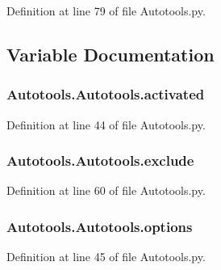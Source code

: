Definition at line 79 of file Autotools.\-py.



\subsection{Variable Documentation}
\hypertarget{group___tools_ga6bbb714a91bc8b6fe749326772b073b3}{
\subsubsection[{activated}]{\setlength{\rightskip}{0pt plus 5cm}Autotools.\-Autotools.\-activated}}\label{group___tools_ga6bbb714a91bc8b6fe749326772b073b3}


Definition at line 44 of file Autotools.\-py.

\hypertarget{group___tools_gaee37d9789ea22ee310ebc357cd721b7f}{
\subsubsection[{exclude}]{\setlength{\rightskip}{0pt plus 5cm}Autotools.\-Autotools.\-exclude}}\label{group___tools_gaee37d9789ea22ee310ebc357cd721b7f}


Definition at line 60 of file Autotools.\-py.

\hypertarget{group___tools_ga8b348e19f0a7104bde9c43c3a6ed695d}{
\subsubsection[{options}]{\setlength{\rightskip}{0pt plus 5cm}Autotools.\-Autotools.\-options}}\label{group___tools_ga8b348e19f0a7104bde9c43c3a6ed695d}


Definition at line 45 of file Autotools.\-py.

